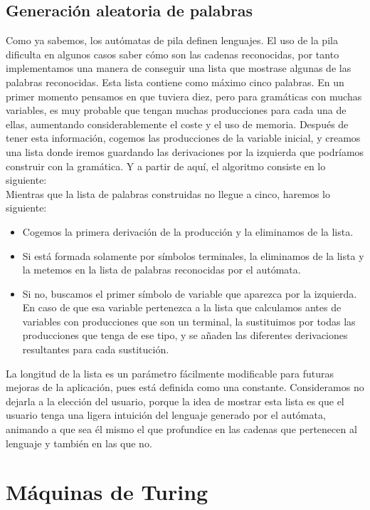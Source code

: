 \documentclass[12pt,a4paper,spanish]{book}
\begin{document}
\subsection{Generaci\'on aleatoria de palabras}
Como ya sabemos, los aut\'omatas de pila definen lenguajes. El uso de la pila dificulta en algunos casos saber c\'omo son las cadenas reconocidas, por tanto implementamos una manera de conseguir una lista que mostrase algunas de las palabras reconocidas.
Esta lista contiene como m\'aximo cinco palabras. En un primer momento pensamos en que tuviera diez, pero para gram\'aticas con muchas variables, es muy probable que tengan muchas producciones para cada una de ellas, aumentando considerablemente el coste y el uso de memoria.
Despu\'es de tener esta informaci\'on, cogemos las producciones de la variable inicial, y creamos una lista donde iremos guardando las derivaciones por la izquierda que podr\'iamos construir con la gram\'atica. Y a partir de aqu\'i, el algoritmo consiste en lo siguiente:\\
\newline
Mientras que la lista de palabras construidas no llegue a cinco, haremos lo siguiente:
\begin{itemize}
\item Cogemos la primera derivaci\'on de la producci\'on y la eliminamos de la lista.
\item Si est\'a formada solamente por s\'imbolos terminales, la eliminamos de la lista y la metemos en la lista de palabras reconocidas por el aut\'omata. 
\item Si no, buscamos el primer s\'imbolo de variable que aparezca por la izquierda. En caso de que esa variable pertenezca a la lista que calculamos antes de variables con producciones que son un terminal, la sustituimos por todas las producciones que tenga de ese tipo, y se a\~naden las diferentes derivaciones resultantes para cada sustituci\'on.
\end{itemize}
La longitud de la lista es un par\'ametro f\'acilmente modificable para futuras mejoras de la aplicaci\'on, pues est\'a definida como una constante. Consideramos no dejarla a la elecci\'on del usuario, porque la idea de mostrar esta lista es que el usuario tenga una ligera intuici\'on del lenguaje generado por el aut\'omata, animando a que sea \'el mismo el que profundice en las cadenas que pertenecen al lenguaje y tambi\'en en las que no.

\newpage
\section{M\'aquinas de Turing}
\end{document}
